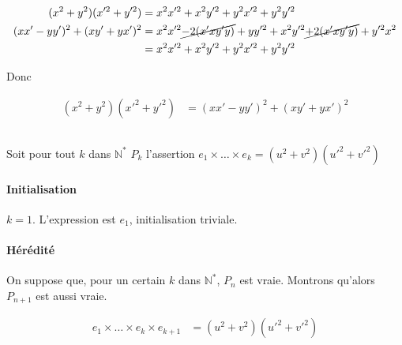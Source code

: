 \documentclass{article}
\newcommand{\N}{\mathds{N}}
\begin{document}
\subsection{}

\begin{align*}
	(x^2+y^2)(x'^2+y'^2)&= x^2x'^2+x^2y'^2+y^2x'^2+y^2y'^2 \\
	(x x' - yy')^2+(xy'+yx')^2 &= x^2x'^2\cancel{-2(x'xy'y)}+yy'^2+x^2y'^2\cancel{+2(x'xy'y)}+y'^2x^2 \\
	&= x^2x'^2+x^2y'^2+y^2x'^2+y^2y'^2 \\
\end{align*}

Donc

\begin{align*}
	(x^2+y^2)(x'^2+y'^2)&=(x x' - yy')^2+(xy'+yx')^2
\end{align*}

\subsection{}

Soit pour tout $k$ dans $\N^{\ast}$ $P_k$ l'assertion $e_1 \times \ldots \times e_k = (u^2+v^2)(u'^2+v'^2)$

\paragraph{Initialisation} $k=1$. L'expression est $e_1$, initialisation triviale.

\paragraph{Hérédité} On suppose que, pour un certain $k$ dans $\N^\ast$, $P_n$ est vraie. Montrons qu'alors $P_{n+1}$ est aussi vraie.

\begin{align*}
	e_1 \times \ldots \times e_k \times e_{k+1} &= (u^2+v^2)(u'^2+v'^2) \\
\end{align*}

\end{document}
